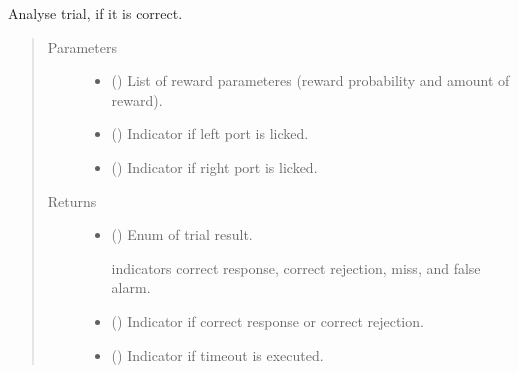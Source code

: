 \documentclass[letterpaper,10pt,english]{sphinxmanual}
\begin{document}

\begin{fulllineitems}
\label{\detokenize{NoSeMazeController/TrialLogic:TrialLogic.TrialConditions.trial_result}}
\pysigstartsignatures
{}
\pysigstopsignatures
\sphinxAtStartPar
Analyse trial, if it is correct.
\begin{quote}\begin{description}
\item[{Parameters}] \leavevmode\begin{itemize}
\item {} 
\sphinxAtStartPar
{} () \textendash{} List of reward parameteres (reward probability and amount of reward).

\item {} 
\sphinxAtStartPar
{} () \textendash{} Indicator if left port is licked.

\item {} 
\sphinxAtStartPar
{} () \textendash{} Indicator if right port is licked.

\end{itemize}

\item[{Returns}] \leavevmode
\sphinxAtStartPar
\begin{itemize}
\item {} 
\sphinxAtStartPar
{} () \textendash{} Enum of trial result.

 indicators \sphinxhyphen{} correct response, correct rejection, miss, and
false alarm.

\item {} 
\sphinxAtStartPar
{} () \textendash{} Indicator if correct response or correct rejection.

\item {} 
\sphinxAtStartPar
{} () \textendash{} Indicator if timeout is executed.

\end{itemize}


\end{description}\end{quote}

\end{fulllineitems}
\end{document}
